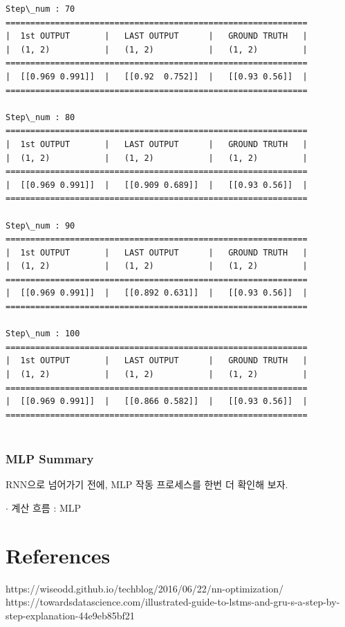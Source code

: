 \documentclass[11pt]{article}
\begin{document}
\begin{Verbatim}[commandchars=\\\{\}]
Step\_num : 70
=============================================================
|  1st OUTPUT       |   LAST OUTPUT      |   GROUND TRUTH   |
|  (1, 2)           |   (1, 2)           |   (1, 2)         |
=============================================================
|  [[0.969 0.991]]  |   [[0.92  0.752]]  |   [[0.93 0.56]]  |
=============================================================

Step\_num : 80
=============================================================
|  1st OUTPUT       |   LAST OUTPUT      |   GROUND TRUTH   |
|  (1, 2)           |   (1, 2)           |   (1, 2)         |
=============================================================
|  [[0.969 0.991]]  |   [[0.909 0.689]]  |   [[0.93 0.56]]  |
=============================================================

Step\_num : 90
=============================================================
|  1st OUTPUT       |   LAST OUTPUT      |   GROUND TRUTH   |
|  (1, 2)           |   (1, 2)           |   (1, 2)         |
=============================================================
|  [[0.969 0.991]]  |   [[0.892 0.631]]  |   [[0.93 0.56]]  |
=============================================================

Step\_num : 100
=============================================================
|  1st OUTPUT       |   LAST OUTPUT      |   GROUND TRUTH   |
|  (1, 2)           |   (1, 2)           |   (1, 2)         |
=============================================================
|  [[0.969 0.991]]  |   [[0.866 0.582]]  |   [[0.93 0.56]]  |
=============================================================


    \end{Verbatim}

    \hypertarget{mlp-summary}{%
\subsubsection{MLP Summary}\label{mlp-summary}}

RNN으로 넘어가기 전에, MLP 작동 프로세스를 한번 더 확인해 보자.

 \(\cdot\) 계산 흐름 : MLP 

    \hypertarget{references}{%
\section{References}\label{references}}

https://wiseodd.github.io/techblog/2016/06/22/nn-optimization/\\
https://towardsdatascience.com/illustrated-guide-to-lstms-and-gru-s-a-step-by-step-explanation-44e9eb85bf21


    
    
    
    
\end{document}
